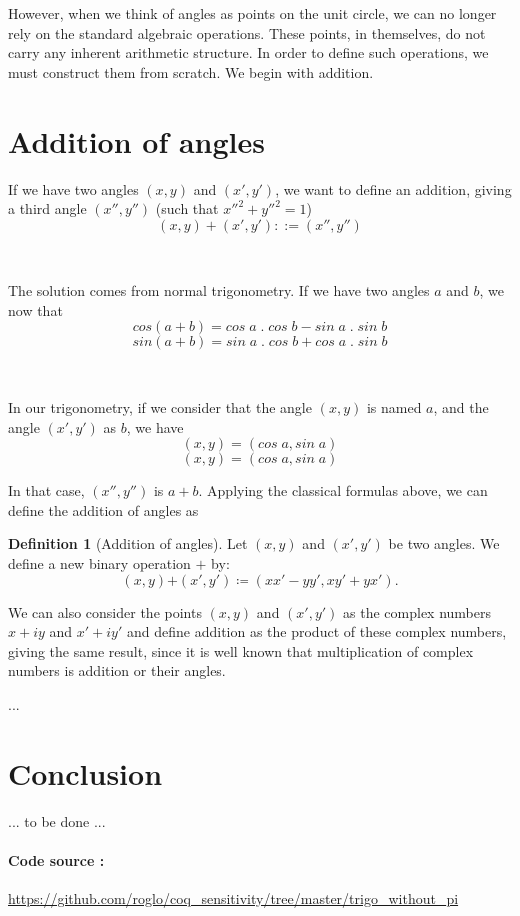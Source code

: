 \documentclass[11pt]{article}
\theoremstyle{definition}
\newtheorem{definition}{Definition}[section]
\begin{document}
However, when we think of angles as points on the unit circle, we can
no longer rely on the standard algebraic operations. These points, in
themselves, do not carry any inherent arithmetic structure. In order
to define such operations, we must construct them from scratch. We
begin with addition.

\section{Addition of angles}

If we have two angles $(x, y)$ and $(x', y')$, we want to define an
addition, giving a third angle $(x'', y'')$ (such that
$x''^2+y''^2=1$)
\[
(x, y) + (x', y') ::= (x'', y'')
\]

\

\noindent The solution comes from normal trigonometry. If we have two
angles $a$ and $b$, we now that
\[
cos(a+b) = cos\;a\;.\;cos\;b - sin\;a\;.\;sin\;b
\]
\[
sin(a+b) = sin\;a\;.\;cos\;b + cos\;a\;.\;sin\;b
\]

\

\noindent In our trigonometry, if we consider that the angle $(x, y)$
is named $a$, and the angle $(x', y')$ as $b$, we have
\[
(x, y) = (cos\;a, sin\;a)
\]
\[
(x, y) = (cos\;a, sin\;a)
\]

\noindent In that case, $(x'', y'')$ is $a + b$.  Applying the
classical formulas above, we can define the addition of angles as

\begin{definition}[Addition of angles]

Let $(x, y)$ and $(x', y')$ be two angles. We define a new binary
operation $\boldsymbol{+}$ by:
\[
(x, y) \boldsymbol{+} (x', y') \coloneqq (x x' - y y', x y' + y x').
\]

\end{definition}

\noindent We can also consider the points $(x, y)$ and $(x', y')$ as
the complex numbers $x+iy$ and $x'+iy'$ and define addition as the
product of these complex numbers, giving the same result, since it is
well known that multiplication of complex numbers is addition or their
angles.

...

\section{Conclusion}

... to be done ...

\paragraph{Code source :}
\url{https://github.com/roglo/coq_sensitivity/tree/master/trigo_without_pi}
\end{document}
